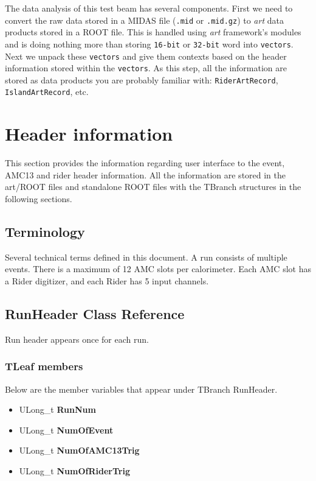 \documentclass[12pt,letterpaper]{article}
\begin{document}
The data analysis of this test beam has several components. First we need to convert the raw data stored in a MIDAS file (\verb+.mid+ or \verb+.mid.gz+) to \textit{art} data products stored in a ROOT file.
This is handled using \textit{art} framework's modules and is doing nothing more than storing \verb+16-bit+ or \verb+32-bit+ word into \verb+vectors+. Next we unpack these \verb+vectors+
and give them contexts based on the header information stored within the \verb+vectors+. As this step, all the information are stored as data products you are probably familiar with: \verb+RiderArtRecord+,
 \verb+IslandArtRecord+, etc.

\section{Header information}
This section provides the information regarding user interface to the event, AMC13 and rider header information. All the information are stored in the art/ROOT files and standalone ROOT files with the TBranch structures in the following sections.

\subsection{Terminology}
Several technical terms defined in this document. A run consists of multiple events. There is a maximum of 12 AMC slots per calorimeter. Each AMC slot has a Rider digitizer, and each Rider has 5 input channels.

\subsection{RunHeader Class Reference}
Run header appears once for each run.

\subsubsection*{TLeaf members}

Below are the member variables that appear under TBranch RunHeader.

\begin{itemize}
\item ULong\_t \textbf{RunNum}
\item ULong\_t \textbf{NumOfEvent}
\item ULong\_t \textbf{NumOfAMC13Trig}
\item ULong\_t \textbf{NumOfRiderTrig}
\end{itemize}
\end{document}
